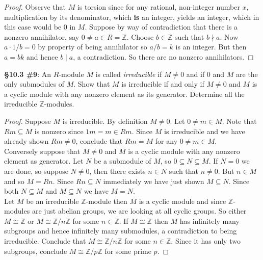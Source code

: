 \documentclass[8pt]{amsart}
\theoremstyle{plain}%
\theoremstyle{definition}
\theoremstyle{remark}
\numberwithin{equation}{section}
\newcommand{\Z}{\mathbb{Z}}
\begin{document}
\begin{proof}
Observe that $M$ is torsion since for any rational, non-integer number $x$, multiplication by its denominator, which \textbf{is} an integer, yields an integer, which in this case would be 0 in $M$. Suppose by way of contradiction that there is a nonzero annihilator, say $0 \neq a \in R = \Z$. Choose $b \in \Z$ such that $b \nmid a$. Now $a \cdot 1/b = 0$ by property of being annihilator so $a/b = k$ is an integer. But then $a = bk$ and hence $b \mid a$, a contradiction. So there are no nonzero annihilators.
	\end{proof}


\textbf{\S 10.3 \#9}: An $R$-module $M$ is called \textit{irreducible} if $M \neq 0$ and if $0$ and $M$ are the only submodules of $M$. Show that $M$ is irreducible if and only if $M \neq 0$ and $M$ is a cyclic module with any nonzero element as its generator. Determine all the irreducible $\Z$-modules.
	\begin{proof}
		Suppose $M$ is irreducible. By definition $M \neq 0$. Let $0 \neq m \in M$. Note that $Rm \subseteq M$ is nonzero since $1m = m \in Rm$. Since $M$ is irreducible and we have already shown $Rm \neq 0$, conclude that $Rm = M$ for any $0 \neq m \in M$.\\

		Conversely suppose that $M \neq 0$ and $M$ is a cyclic module with any nonzero element as generator. Let $N$ be a submodule of $M$, so $0 \subseteq N \subseteq M$. If $N = 0$ we are done, so suppose $N \neq 0$, then there exists $n \in N$ such that $n \neq 0$. But $n \in M$ and so $M = Rn$. Since $Rn \subseteq N$ immediately we have just shown $M \subseteq N$. Since both $N \subseteq M$ and $M \subseteq N$ we have $M = N$.\\

		Let $M$ be an irreducible $\Z$-module then $M$ is { \color{red} a cyclic module and since $\Z$-modules are just abelian groups, we are looking at all cyclic groups. So either $M \cong \Z$ or $M \cong \Z/n\Z$ for some $n \in \Z$. If $M \cong \Z$ then $M$ has infinitely many subgroups and hence infinitely many submodules, a contradiction to being irreducible. Conclude that $M \cong \Z/n\Z$ for some $n \in \Z$. Since it has only two subgroups, conclude $M \cong \Z/p\Z$ for some prime $p$.}
	\end{proof}
\end{document}

